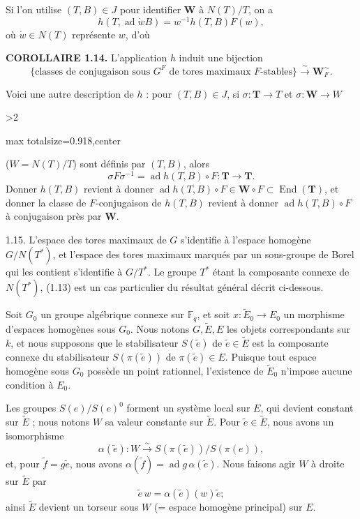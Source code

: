 \documentclass[9pt,twoside]{extarticle}
\newcommand{\EditionPage}[3]{%
  \ifnum#1>2\clearpage\fi
  \pdfbookmark[1]{Printed page #2}{fr-folio-#2}%
  \hypertarget{fr-physical-#1}{}%
  \noindent\begin{adjustbox}{max totalsize={\textwidth}{0.918\textheight},center}
  \begin{minipage}[t]{\textwidth}
  \fontsize{9.4}{11.1}\selectfont\justifying
  #3
  \end{minipage}
  \end{adjustbox}%
}
\begin{document}
{Si l'on utilise \((T,B)\in J\) pour identifier \(\mathbf W\) à \(N(T)/T\), on a \[
\tag{1.13.1}
h(T,\operatorname{ad}\dot wB)=w^{-1}h(T,B)F(w),
\] où \(\dot w\in N(T)\) représente \(w\), d'où\par

\noindent\textbf{COROLLAIRE 1.14.} L'application \(h\) induit une bijection \[
\{\text{classes de conjugaison sous }G^F\text{ de tores maximaux }F\text{-stables}\}\xrightarrow{\sim}\mathbf W_F^{\sim}.
\]\par

Voici une autre description de \(h\) : pour \((T,B)\in J\), si \(\sigma:\mathbf T\to T\) et \(\sigma:\mathbf W\to W\)\par
}

\EditionPage{12}{113}{%
(\(W=N(T)/T\)) sont définis par \((T,B)\), alors \[
\sigma F\sigma^{-1}=\operatorname{ad}h(T,B)\circ F:\mathbf T\longrightarrow\mathbf T.
\] Donner \(h(T,B)\) revient à donner \(\operatorname{ad}h(T,B)\circ F\in\mathbf W\circ F\subset\operatorname{End}(\mathbf T)\), et donner la classe de \(F\)-conjugaison de \(h(T,B)\) revient à donner \(\operatorname{ad}h(T,B)\circ F\) à conjugaison près par \(\mathbf W\).\par

1.15. L'espace des tores maximaux de \(G\) s'identifie à l'espace homogène \(G/N(T^*)\), et l'espace des tores maximaux marqués par un sous-groupe de Borel qui les contient s'identifie à \(G/T^*\). Le groupe \(T^*\) étant la composante connexe de \(N(T^*)\), (1.13) est un cas particulier du résultat général décrit ci-dessous.\par

Soit \(G_0\) un groupe algébrique connexe sur \(\mathbb F_q\), et soit \(x:\widetilde E_0\to E_0\) un morphisme d'espaces homogènes sous \(G_0\). Nous notons \(G,\widetilde E,E\) les objets correspondants sur \(k\), et nous supposons que le stabilisateur \(S(\widetilde e)\) de \(\widetilde e\in\widetilde E\) est la composante connexe du stabilisateur \(S(\pi(\widetilde e))\) de \(\pi(\widetilde e)\in E\). Puisque tout espace homogène sous \(G_0\) possède un point rationnel, l'existence de \(\widetilde E_0\) n'impose aucune condition à \(E_0\).\par

Les groupes \(S(e)/S(e)^0\) forment un système local sur \(E\), qui devient constant sur \(\widetilde E\) ; nous notons \(W\) sa valeur constante sur \(\widetilde E\). Pour \(\widetilde e\in\widetilde E\), nous avons un isomorphisme \[
\alpha(\widetilde e):W\xrightarrow{\sim}S(\pi(\widetilde e))/S(\pi(e)),
\] et, pour \(\widetilde f=g\widetilde e\), nous avons \(\alpha(\widetilde f)=\operatorname{ad}g\,\alpha(\widetilde e)\). Nous faisons agir \(W\) à droite sur \(\widetilde E\) par \[
\widetilde e\,w=\alpha(\widetilde e)(w)\widetilde e ;
\] ainsi \(\widetilde E\) devient un torseur sous \(W\) (= espace homogène principal) sur \(E\).\par

}
\end{document}
